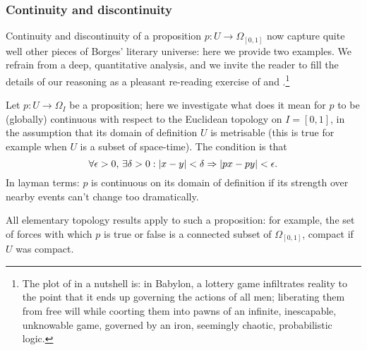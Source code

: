 \subsubsection{Continuity and discontinuity} Continuity and discontinuity of a proposition $p : U \to \Omega_{[0,1]}$ now capture quite well other pieces of Borges' literary universe: here we provide two examples. We refrain from a deep, quantitative analysis, and we invite the reader to fill the details of our reasoning as a pleasant re-reading exercise of \cite{babil} and \cite{tlonEN}.\footnote{The plot of \cite{babil} in a nutshell is: in Babylon, a lottery game infiltrates reality to the point that it ends up governing the actions of all men; liberating them from free will while coorting them into pawns of an infinite, inescapable, unknowable game, governed by an iron, seemingly chaotic, probabilistic logic.}
\begin{remark}\label{continuiti}
  Let $p : U \to \Omega_I$ be a proposition; here we investigate what does it mean for $p$ to be (globally) continuous with respect to the Euclidean topology on $I=[0,1]$, in the assumption that its domain of definition $U$ is metrisable (this is true for example when $U$ is a subset of space-time). The condition is that
  \[ \forall \epsilon > 0,\,\exists \delta > 0 : |x-y|< \delta \Rightarrow |px-py| < \epsilon. \]
  In layman terms: $p$ is continuous on its domain of definition if its strength over nearby events can't change too dramatically.

  All elementary topology results apply to such a proposition: for example, the set of forces with which $p$ is true or false is a connected subset of $\Omega_{[0,1]}$, compact if $U$ was compact.
\end{remark}
